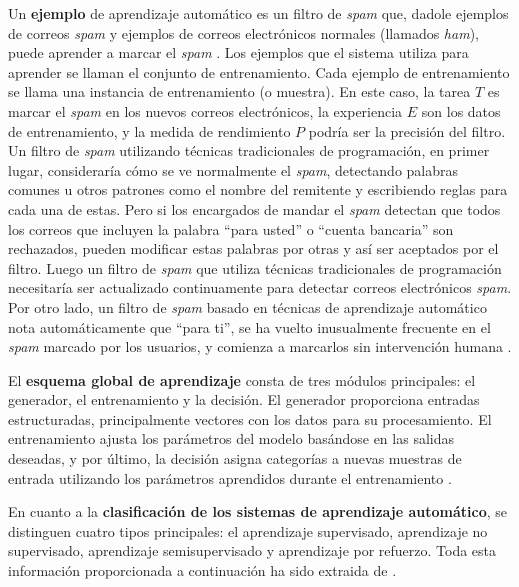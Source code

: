 Un \textbf{ejemplo} de aprendizaje automático es un filtro de \textit{spam} que, dadole ejemplos de correos \textit{spam} y ejemplos de correos electrónicos normales (llamados \textit{ham}), puede aprender a marcar el \textit{spam} \citep{geron2022hands}. Los ejemplos que el sistema utiliza para aprender se llaman el conjunto de entrenamiento. Cada ejemplo de entrenamiento se llama una instancia de entrenamiento (o muestra). En este caso, la tarea \(T\) es marcar el \textit{spam} en los nuevos correos electrónicos, la experiencia \(E\) son los datos de entrenamiento, y la medida de rendimiento \(P\) podría ser la precisión del filtro. Un filtro de \textit{spam} utilizando técnicas tradicionales de programación, en primer lugar, consideraría cómo se ve normalmente el \textit{spam}, detectando palabras comunes u otros patrones como el nombre del remitente y escribiendo reglas para cada una de estas. Pero si los encargados de mandar el \textit{spam} detectan que todos los correos que incluyen la palabra ``para usted'' o  ``cuenta bancaria'' son rechazados, pueden modificar estas palabras por otras y así ser aceptados por el filtro. Luego un filtro de \textit{spam} que utiliza técnicas tradicionales de programación necesitaría ser actualizado continuamente para detectar correos electrónicos \textit{spam}. Por otro lado, un filtro de \textit{spam} basado en técnicas de aprendizaje automático nota automáticamente que ``para ti'', se ha vuelto inusualmente frecuente en el \textit{spam} marcado por los usuarios, y comienza a marcarlos sin intervención humana \citep{geron2022hands}.


El \textbf{esquema global de aprendizaje} consta de tres módulos principales: el generador, el entrenamiento y la decisión. El generador proporciona entradas estructuradas, principalmente vectores con los datos para su procesamiento. El entrenamiento ajusta los parámetros del modelo basándose en las salidas deseadas, y por último, la decisión asigna categorías a nuevas muestras de entrada utilizando los parámetros aprendidos durante el entrenamiento \citep{pajares2021aprendizaje}.


En cuanto a la \textbf{clasificación de los sistemas de aprendizaje automático}, se distinguen cuatro tipos principales: el aprendizaje supervisado, aprendizaje no supervisado, aprendizaje semisupervisado y aprendizaje por refuerzo. Toda esta información proporcionada a continuación ha sido extraida de \citep{geron2022hands}.

